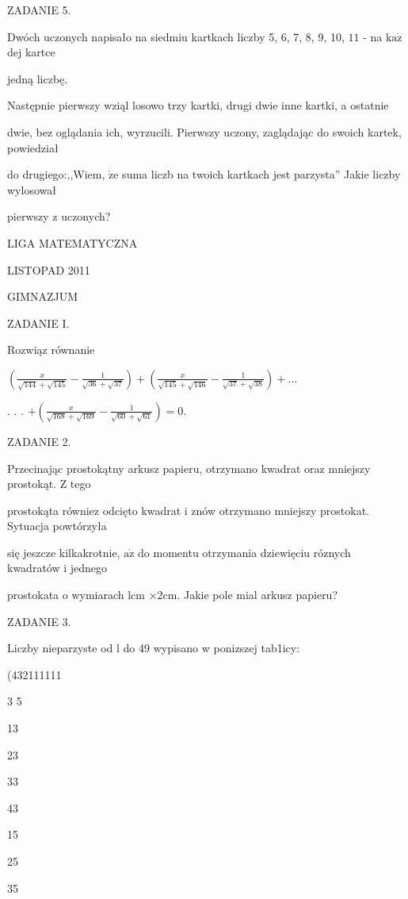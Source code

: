 \documentclass[a4paper,12pt]{article}
\begin{document}
ZADANIE 5.

Dwóch uczonych napisało na siedmiu kartkach liczby 5, 6, 7, 8, 9, 10, $11$ - na $\mathrm{k}\mathrm{a}\dot{\mathrm{z}}$ dej kartce

jedną liczbę.

Następnie pierwszy wziąl losowo trzy kartki, drugi dwie inne kartki, a ostatnie

dwie, bez oglądania ich, wyrzucili. Pierwszy uczony, zaglądając do swoich kartek, powiedział

do drugiego:,,Wiem, $\dot{\mathrm{z}}\mathrm{e}$ suma liczb na twoich kartkach jest parzysta'' Jakie liczby wylosował

pierwszy z uczonych?






LIGA MATEMATYCZNA

LISTOPAD 2011

GIMNAZJUM

ZADANIE I.

Rozwiąz równanie

$(\displaystyle \frac{x}{\sqrt{144}+\sqrt{145}}-\frac{1}{\sqrt{36}+\sqrt{37}})+(\frac{x}{\sqrt{145}+\sqrt{146}}-\frac{1}{\sqrt{37}+\sqrt{38}})+\ldots$

. . . $+(\displaystyle \frac{x}{\sqrt{168}+\sqrt{169}}-\frac{1}{\sqrt{60}+\sqrt{61}}) =0.$

ZADANIE 2.

Przecinając prostokątny arkusz papieru, otrzymano kwadrat oraz mniejszy prostokąt. $\mathrm{Z}$ tego

prostokąta równiez odcięto kwadrat i znów otrzymano mniejszy prostokat. Sytuacja powtórzyła

się jeszcze kilkakrotnie, $\mathrm{a}\dot{\mathrm{z}}$ do momentu otrzymania dziewięciu róznych kwadratów i jednego

prostokata o wymiarach lcm $\times 2\mathrm{c}\mathrm{m}$. Jakie pole mial arkusz papieru?

ZADANIE 3.

Liczby nieparzyste od l do 49 wypisano w ponizszej tab1icy:

(432111111

3 5

13

23

33

43

15

25

35
\end{document}
